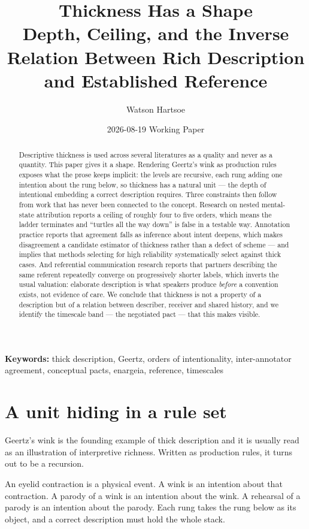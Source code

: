 \documentclass[11pt,a4paper]{article}
\title{\textbf{Thickness Has a Shape}\\[.35em]\large Depth, Ceiling, and the Inverse Relation Between Rich Description and Established Reference}
\author{Watson Hartsoe}
\date{2026-08-19 \quad\textemdash\quad Working Paper}
\begin{document}
\maketitle
\begin{abstract}\noindent Descriptive thickness is used across several literatures as a quality and never as a quantity. This paper gives it a shape. Rendering Geertz's wink as production rules exposes what the prose keeps implicit: the levels are recursive, each rung adding one intention about the rung below, so thickness has a natural unit --- the depth of intentional embedding a correct description requires. Three constraints then follow from work that has never been connected to the concept. Research on nested mental-state attribution reports a ceiling of roughly four to five orders, which means the ladder terminates and ``turtles all the way down'' is false in a testable way. Annotation practice reports that agreement falls as inference about intent deepens, which makes disagreement a candidate estimator of thickness rather than a defect of scheme --- and implies that methods selecting for high reliability systematically select against thick cases. And referential communication research reports that partners describing the same referent repeatedly converge on progressively shorter labels, which inverts the usual valuation: elaborate description is what speakers produce \emph{before} a convention exists, not evidence of care. We conclude that thickness is not a property of a description but of a relation between describer, receiver and shared history, and we identify the timescale band --- the negotiated pact --- that this makes visible.\end{abstract}
\vspace{-.5em}\noindent\textbf{Keywords:} thick description, Geertz, orders of intentionality, inter-annotator agreement, conceptual pacts, enargeia, reference, timescales\par\vspace{1em}
\section{A unit hiding in a rule set}
Geertz's wink is the founding example of thick description and it is usually read as an illustration of interpretive richness. Written as production rules, it turns out to be a recursion.

An eyelid contraction is a physical event. A wink is an intention about that contraction. A parody of a wink is an intention about the wink. A rehearsal of a parody is an intention about the parody. Each rung takes the rung below as its object, and a correct description must hold the whole stack.
\end{document}
